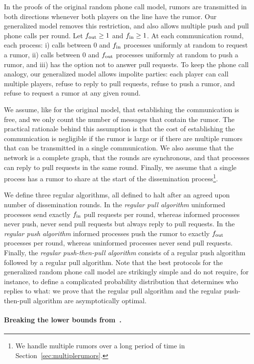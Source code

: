 In the proofs of the original random phone call model, rumors are transmitted in both directions whenever both players on the line have the rumor. Our generalized model removes this restriction, and also allows multiple push and pull phone calls per round. Let $f_\text{out} \geq 1$ and $f_\text{in} \geq 1$. At each communication round, each process: i) calls between 0 and $f_\text{in}$ processes uniformly at random to request a rumor, ii) calls between 0 and $f_\text{out}$ processes uniformly at random to push a rumor, and iii) has the option not to answer pull requests. To keep the phone call analogy, our generalized model allows impolite parties: each player can call multiple players, refuse to reply to pull requests, refuse to push a rumor, and refuse to request a rumor at any given round. 

We assume, like for the original model, that establishing the communication is free, and we only count the number of messages that contain the rumor. The practical rationale behind this assumption is that the cost of establishing the communication is negligible if the rumor is large or if there are multiple rumors that can be transmitted in a single communication. 
We also assume that the network is a complete graph, 
that the rounds are synchronous, and that processes can reply to pull requests in the same round. Finally, we assume that a single process has a rumor to share at the start of the dissemination process\footnote{We handle multiple rumors over a long period of time in Section~\ref{sec:multiplerumors}.}. 

We define three regular algorithms, all defined to halt after an agreed upon number of dissemination rounds. 
In the \emph{regular pull algorithm} uninformed processes send exactly $f_\text{in}$ pull requests per round, whereas informed processes never push, never send pull requests but always reply to pull requests.  In the \emph{regular push algorithm} informed processes push the rumor to exactly $f_\text{out}$ processes per round, whereas uninformed processes never send pull requests. Finally, the \emph{regular push-then-pull algorithm} consists of a regular push algorithm followed by a regular pull algorithm. Note that the best protocols for the generalized random phone call model are strikingly simple and do not require, for instance, to define a complicated probability distribution that determines who replies to what: we prove that the regular pull algorithm and the regular push-then-pull algorithm are asymptotically optimal.

\paragraph{\textbf{Breaking the lower bounds from~\cite{DBLP:conf/focs/KarpSSV00}.}}


